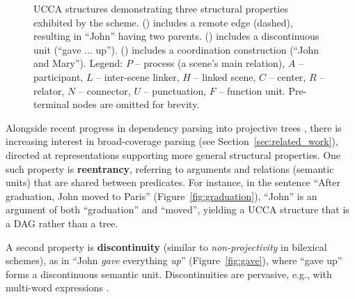 \documentclass[11pt]{article}
\newcommand{\secref}[1]{Section~\ref{#1}}
\newcommand{\figref}[1]{Figure~\ref{#1}}
\begin{document}
\begin{figure}[t]
\begin{subfigure}[t]{.9\columnwidth}
  \hspace{.1\columnwidth}
  \parbox{.7\columnwidth}{
  }
  \end{subfigure}
  \caption{\label{fig:examples}
    UCCA structures demonstrating three structural properties exhibited by
    the scheme.
    () includes a remote edge (dashed),
    resulting in ``John'' having two parents.
    () includes a discontinuous unit (``gave ... up'').
    () includes a coordination construction (``John and Mary'').
    Legend: $P$ -- process (a scene's main relation), $A$ -- participant,
    $L$ -- inter-scene linker, $H$ -- linked scene, $C$ -- center,
    $R$ -- relator, $N$ -- connector, $U$ -- punctuation, $F$ -- function unit.
    Pre-terminal nodes are omitted for brevity.
  }
\end{figure}

Alongside recent progress in dependency parsing into projective trees
\cite{dyer2015transition,andor2016globally,kiperwasser2016simple},
there is increasing interest in broad-coverage parsing
(see \secref{sec:related_work}),
directed at representations supporting more general structural properties.
One such property is \textbf{reentrancy},
referring to arguments and relations (semantic units) that are shared between predicates.
For instance, in the sentence
``After graduation, John moved to Paris'' (\figref{fig:graduation}),
``John'' is an argument of both ``graduation''
and ``moved'', yielding a UCCA structure that is a DAG rather than a tree.

A second property is \textbf{discontinuity} (similar to \textit{non-projectivity} in bilexical schemes), as in ``John \textit{gave} everything \textit{up}''
(\figref{fig:gave}), where ``gave up'' forms a discontinuous semantic unit.
Discontinuities are pervasive, e.g.,  with multi-word
expressions \cite{schneider2014discriminative}.
\end{document}
